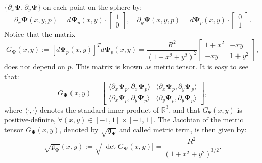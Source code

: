 $\{{\partial_x \boldsymbol{\Psi}},  {\partial_y \boldsymbol{\Psi}}\}$ on each point on the sphere by:
\begin{equation*}
	{\partial_x \boldsymbol{\boldsymbol{\Psi}}}(x,y,p) = d\boldsymbol{\boldsymbol{\Psi}}_{p}(x,y) \cdot
	\begin{bmatrix}
		 1 \\
		 0
	\end{bmatrix}, \quad
	{\partial_y \boldsymbol{\boldsymbol{\Psi}}}(x,y,p) = d\boldsymbol{\boldsymbol{\Psi}}_{p}(x,y) \cdot
	\begin{bmatrix}
		 0 \\
		 1
	\end{bmatrix}.
\end{equation*}
Notice that the matrix
\begin{equation*}
	\label{chp-cs-eqdistant-Psitensor}
	G_{\boldsymbol{\Psi}}(x,y) := 
	[d\boldsymbol{\Psi}_{p}(x,y)]^Td\boldsymbol{\Psi}_{p}(x,y)
	= \frac{R^2}{(1 + x^2 + y^2)^2}
	\begin{bmatrix}
		  1+ x^2 &  -xy \\
		 -xy & 1 + y^2
	\end{bmatrix},
\end{equation*}
does not depend on $p$.
This matrix is known as metric tensor.
It is easy to see that:
\begin{equation}
	\label{chp-cs-eqdistant-Psi-metric-tensor}
	G_{\boldsymbol{\Psi}}(x,y) = 
	\begin{bmatrix}
		\langle  {\partial_x \boldsymbol{\Psi}_p}, {\partial_x  \boldsymbol{\Psi}_p} \rangle & 
		\langle  {\partial_x \boldsymbol{\Psi}_p}, {\partial_y  \boldsymbol{\Psi}_p} \rangle \\
		\langle  {\partial_x  \boldsymbol{\Psi}_p}, {\partial_y  \boldsymbol{\Psi}_p} \rangle  &
		\langle  {\partial_y  \boldsymbol{\Psi}_p}, {\partial_y  \boldsymbol{\Psi}_p} \rangle 
	\end{bmatrix},
\end{equation}
where $\langle \cdot, \cdot \rangle$ denotes 
the standard inner product of $\mathbb{R}^3$,
and that $G_{\Psi}(x,y)$ is positive-definite, 
$\forall (x,y) \in [-1,1]\times[-1,1]$.
The Jacobian of the metric tensor $G_{\boldsymbol{\Psi}}(x,y)$, denoted by $\sqrt{\mathfrak{g}_{\boldsymbol{\Psi}}}$ and called metric term, is then given by:
\begin{equation*}
        \sqrt{\mathfrak{g}_{\boldsymbol{\Psi}}}(x,y) :=
	\sqrt{|\det{G_{\boldsymbol{\Psi}}(x,y)}|} = \frac{R^2}{(1+x^2+y^2)^{3/2}}.
\end{equation*}
